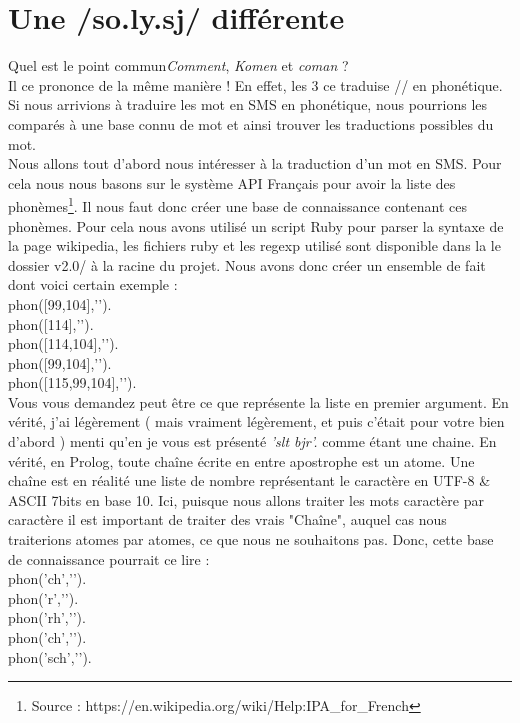 \documentclass[11pt]{book}
\begin{document}
	\section{Une /so.ly.sj/ différente}
	Quel est le point commun{\em Comment}, {\em Komen} et {\em coman} ?\\
	Il ce prononce de la même manière ! En effet, les 3 ce traduise // en phonétique. Si nous arrivions à traduire les mot en SMS en phonétique, nous pourrions les comparés à une base connu de mot et ainsi trouver les traductions possibles du mot.\\
	Nous allons tout d'abord nous intéresser à la traduction d'un mot en SMS. Pour cela nous nous basons sur le système API Français pour avoir la liste des phonèmes\footnote{Source : https://en.wikipedia.org/wiki/Help:IPA\_for\_French}. Il nous faut donc créer une base de connaissance contenant ces phonèmes. Pour cela nous avons utilisé un script Ruby pour parser la syntaxe de la page wikipedia, les fichiers ruby et les regexp utilisé sont disponible dans la le dossier v2.0/ à la racine du projet.
	Nous avons donc créer un ensemble de fait dont voici certain exemple :\\
	
	\indent phon([99,104],'').\\
	\indent phon([114],'').\\
	\indent phon([114,104],'').\\
	\indent phon([99,104],'').\\
	\indent phon([115,99,104],'').\\
	
	Vous vous demandez peut être ce que représente la liste en premier argument. En vérité, j'ai légèrement ( mais vraiment légèrement, et puis c'était pour votre bien d'abord ) menti qu'en je vous est présenté {\em 'slt bjr'.} comme étant une chaine. En vérité, en Prolog, toute chaîne écrite en entre apostrophe est un atome. Une chaîne est en réalité une liste de nombre représentant le caractère en UTF-8 \& ASCII 7bits en base 10. Ici, puisque nous allons traiter les mots caractère par caractère il est important de traiter des vrais "Chaîne", auquel cas nous traiterions atomes par atomes, ce que nous ne souhaitons pas. Donc, cette base de connaissance pourrait ce lire :\\
	
	\indent phon('ch','').\\
	\indent phon('r','').\\
	\indent phon('rh','').\\
	\indent phon('ch','').\\
	\indent phon('sch','').\\
	
\end{document}
